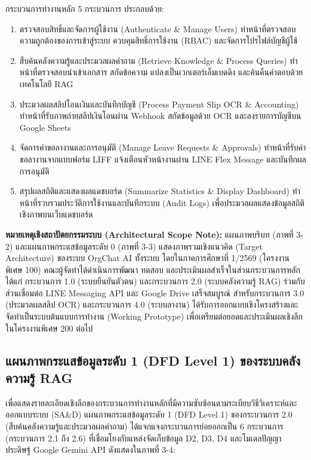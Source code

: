 \hspace*{1.3em}
กระบวนการทำงานหลัก 5 กระบวนการ ประกอบด้วย:
\begin{enumerate}[leftmargin=3.5em]
\item[1.0] ตรวจสอบสิทธิ์และจัดการผู้ใช้งาน (Authenticate \& Manage Users) ทำหน้าที่ตรวจสอบความถูกต้องของการเข้าสู่ระบบ ควบคุมสิทธิ์การใช้งาน (RBAC) และจัดการโปรไฟล์บัญชีผู้ใช้
\item[2.0] สืบค้นคลังความรู้และประมวลผลคำถาม (Retrieve Knowledge \& Process Queries) ทำหน้าที่ตรวจสอบนำเข้าเอกสาร สกัดข้อความ แปลงเป็นเวกเตอร์เอ็มเบดดิง และค้นคืนคำตอบด้วยเทคโนโลยี RAG
\item[3.0] ประมวลผลสลิปโอนเงินและบันทึกบัญชี (Process Payment Slip OCR \& Accounting) ทำหน้าที่รับภาพถ่ายสลิปเงินโอนผ่าน Webhook สกัดข้อมูลด้วย OCR และลงรายการบัญชีบน Google Sheets
\item[4.0] จัดการคำขอลางานและการอนุมัติ (Manage Leave Requests \& Approvals) ทำหน้าที่รับคำขอลางานจากแบบฟอร์ม LIFF แจ้งเตือนหัวหน้างานผ่าน LINE Flex Message และบันทึกผลการอนุมัติ
\item[5.0] สรุปผลสถิติและแสดงผลแดชบอร์ด (Summarize Statistics \& Display Dashboard) ทำหน้าที่รวบรวมประวัติการใช้งานและบันทึกระบบ (Audit Logs) เพื่อประมวลผลแสดงข้อมูลสถิติเชิงภาพบนเว็บแดชบอร์ด
\end{enumerate}

\noindent\textbf{หมายเหตุเชิงสถาปัตยกรรมระบบ (Architectural Scope Note):} แผนภาพบริบท (ภาพที่ 3-2) และแผนภาพกระแสข้อมูลระดับ 0 (ภาพที่ 3-3) แสดงภาพรวมเชิงแนวคิด (Target Architecture) ของระบบ OrgChat AI ทั้งระบบ โดยในภาคการศึกษาที่ 1/2569 (โครงงานพิเศษ 100) คณะผู้จัดทำได้ดำเนินการพัฒนา ทดสอบ และประเมินผลสำเร็จในส่วนกระบวนการหลัก ได้แก่ กระบวนการ 1.0 (ระบบยืนยันตัวตน) และกระบวนการ 2.0 (ระบบคลังความรู้ RAG) ร่วมกับส่วนเชื่อมต่อ LINE Messaging API และ Google Drive เสร็จสมบูรณ์ สำหรับกระบวนการ 3.0 (ประมวลผลสลิป OCR) และกระบวนการ 4.0 (ระบบลางาน) ได้รับการออกแบบเชิงโครงสร้างและจัดทำเป็นระบบต้นแบบการทำงาน (Working Prototype) เพื่อเตรียมต่อยอดและประเมินผลเชิงลึกในโครงงานพิเศษ 200 ต่อไป

\subsection{แผนภาพกระแสข้อมูลระดับ 1 (DFD Level 1) ของระบบคลังความรู้ RAG}
\hspace*{1.3em}
เพื่อแสดงรายละเอียดเชิงลึกของกระบวนการทำงานหลักที่มีความซับซ้อนตามระเบียบวิธีวิเคราะห์และออกแบบระบบ (SA\&D) แผนภาพกระแสข้อมูลระดับ 1 (DFD Level 1) ของกระบวนการ 2.0 (สืบค้นคลังความรู้และประมวลผลคำถาม) ได้แจกแจงกระบวนการย่อยออกเป็น 6 กระบวนการ (กระบวนการ 2.1 ถึง 2.6) ที่เชื่อมโยงกับแหล่งจัดเก็บข้อมูล D2, D3, D4 และโมเดลปัญญาประดิษฐ์ Google Gemini API ดังแสดงในภาพที่ 3-4:

